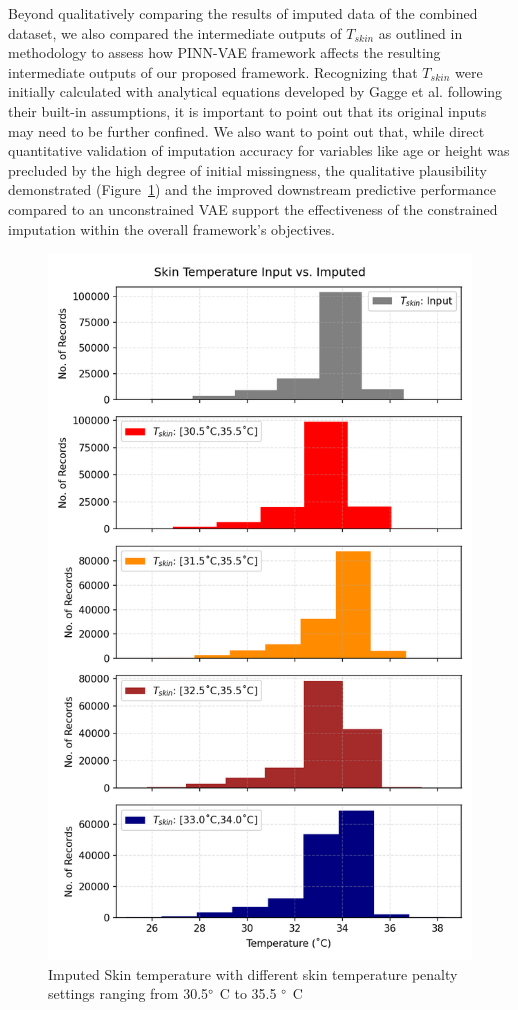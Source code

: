 Beyond qualitatively comparing the results of imputed data of the combined dataset, we also compared the intermediate outputs of $T_{skin}$ as outlined in methodology to assess how PINN-VAE framework affects the resulting intermediate outputs of our proposed framework. Recognizing that $T_{skin}$ were initially calculated with analytical equations developed by Gagge et al. following their built-in assumptions, it is important to point out that its original inputs may need to be further confined. We also want to point out that, while direct quantitative validation of imputation accuracy for variables like age or height was precluded by the high degree of initial missingness, the qualitative plausibility demonstrated (Figure~\ref{fig:skin_inputs}) and the improved downstream predictive performance compared to an unconstrained VAE support the effectiveness of the constrained imputation within the overall framework's objectives.
\begin{figure}[h!]
    \centering
    \includegraphics[width=0.45\linewidth]{fig/skinimput.png}
    \caption{Imputed Skin temperature with different skin temperature penalty settings ranging from 30.5$\degree$ C to 35.5 $\degree$ C}
    \label{fig:skin_inputs}
\end{figure}


